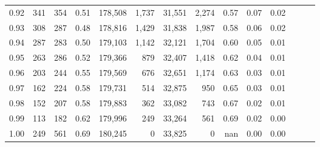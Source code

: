 \begin{tabular}{rrrrrrrrrrrrrr}
0.92 &    341 &  354 &  0.51 &  178,508 &    1,737 &  31,551 &   2,274 &  0.57 &  0.07 &      0.02 \\
0.93 &    308 &  287 &  0.48 &  178,816 &    1,429 &  31,838 &   1,987 &  0.58 &  0.06 &      0.02 \\
0.94 &    287 &  283 &  0.50 &  179,103 &    1,142 &  32,121 &   1,704 &  0.60 &  0.05 &      0.01 \\
0.95 &    263 &  286 &  0.52 &  179,366 &      879 &  32,407 &   1,418 &  0.62 &  0.04 &      0.01 \\
0.96 &    203 &  244 &  0.55 &  179,569 &      676 &  32,651 &   1,174 &  0.63 &  0.03 &      0.01 \\
0.97 &    162 &  224 &  0.58 &  179,731 &      514 &  32,875 &     950 &  0.65 &  0.03 &      0.01 \\
0.98 &    152 &  207 &  0.58 &  179,883 &      362 &  33,082 &     743 &  0.67 &  0.02 &      0.01 \\
0.99 &    113 &  182 &  0.62 &  179,996 &      249 &  33,264 &     561 &  0.69 &  0.02 &      0.00 \\
1.00 &    249 &  561 &  0.69 &  180,245 &        0 &  33,825 &       0 &   nan &  0.00 &      0.00 \\
\bottomrule
\end{tabular}
